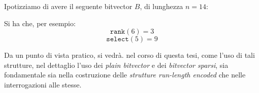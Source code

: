 \begin{esempio}
  Ipotizziamo di avere il seguente bitvector $B$, di lunghezza $n=14$:
  \begin{center}
  \end{center}
  Si ha che, per esempio:
  \[\mathtt{rank}(6)=3\]
  \[\mathtt{select}(5) =9\]
\end{esempio}
Da un punto di vista pratico, si vedrà. nel corso di questa tesi, come l'uso di
tali strutture, nel dettaglio l'uso dei \textit{plain bitvector} e dei
\textit{bitvector sparsi}, sia fondamentale sia nella costruzione delle
\textit{strutture run-length encoded} che nelle interrogazioni alle stesse.


